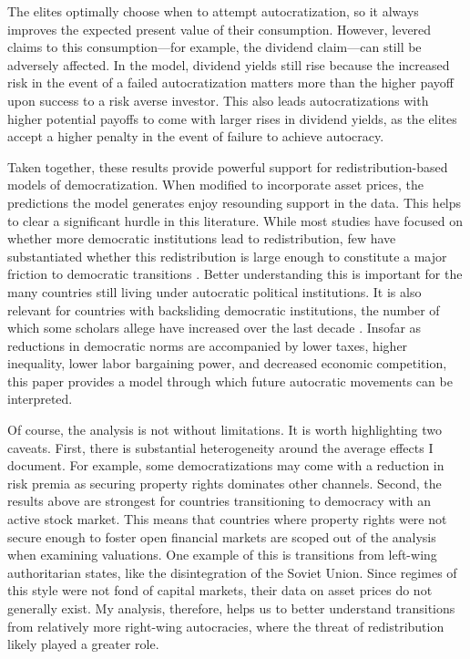 The elites optimally choose when to attempt autocratization, so it always improves the expected present value of their consumption. However, levered claims to this consumption---for example, the dividend claim---can still be adversely affected. In the model, dividend yields still rise because the increased risk in the event of a failed autocratization matters more than the higher payoff upon success to a risk averse investor. This also leads autocratizations with higher potential payoffs to come with larger rises in dividend yields, as the elites accept a higher penalty in the event of failure to achieve autocracy.

Taken together, these results provide powerful support for redistribution-based models of democratization. When modified to incorporate asset prices, the predictions the model generates enjoy resounding support in the data.  This helps to clear a significant hurdle in this literature. While most studies have focused on whether more democratic institutions lead to redistribution, few have substantiated whether this redistribution is large enough to constitute a major friction to democratic transitions \citep{Boix2003,Hinnerich2014,Acemoglu2015}. Better understanding this is important for the many countries still living under autocratic political institutions. It is also relevant for countries with backsliding democratic institutions, the number of which some scholars allege have increased over the last decade \citep{Diamond2015}. Insofar as reductions in democratic norms are accompanied by lower taxes, higher inequality, lower labor bargaining power, and decreased economic competition, this paper provides a model through which future autocratic movements can be interpreted.

\label{par:limitation_acknowledge_beg}
Of course, the analysis is not without limitations. It is worth highlighting two caveats. First, there is substantial heterogeneity around the average effects I document. For example, some democratizations may come with a reduction in risk premia as securing property rights dominates other channels. Second, the results above are strongest for countries transitioning to democracy with an active stock market.  This means that countries where property rights were not secure enough to foster open financial markets are scoped out of the analysis when examining valuations. One example of this is transitions from left-wing authoritarian states, like the disintegration of the Soviet Union. Since regimes of this style were not fond of capital markets, their data on asset prices do not generally exist. My analysis, therefore, helps us to better understand transitions from relatively more right-wing autocracies, where the threat of redistribution likely played a greater role.

